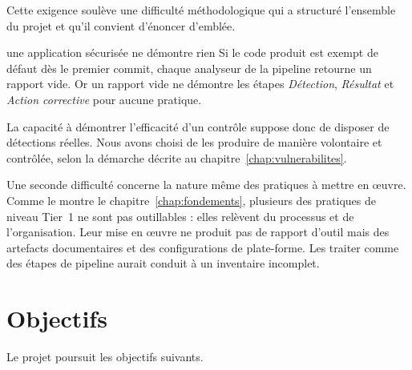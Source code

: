 Cette exigence soulève une difficulté méthodologique qui a structuré l'ensemble
du projet et qu'il convient d'énoncer d'emblée.

\begin{constat}{une application sécurisée ne démontre rien}
Si le code produit est exempt de défaut dès le premier commit, chaque analyseur
de la pipeline retourne un rapport vide. Or un rapport vide ne démontre les
étapes \emph{Détection}, \emph{Résultat} et \emph{Action corrective} pour
aucune pratique.

La capacité à démontrer l'efficacité d'un contrôle suppose donc de disposer de
détections réelles. Nous avons choisi de les produire de manière volontaire et
contrôlée, selon la démarche décrite au chapitre~\ref{chap:vulnerabilites}.
\end{constat}

Une seconde difficulté concerne la nature même des pratiques à mettre en œuvre.
Comme le montre le chapitre~\ref{chap:fondements}, plusieurs des pratiques de
niveau Tier~1 ne sont pas outillables : elles relèvent du processus et de
l'organisation. Leur mise en œuvre ne produit pas de rapport d'outil mais des
artefacts documentaires et des configurations de plate-forme. Les traiter comme
des étapes de pipeline aurait conduit à un inventaire incomplet.

\section{Objectifs}

Le projet poursuit les objectifs suivants.

